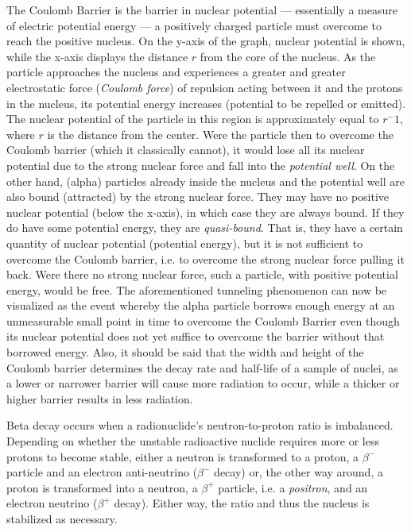 The Coulomb Barrier is the barrier in nuclear potential --- essentially a measure of electric potential energy --- a positively charged particle must overcome to reach the positive nucleus. On the y-axis of the graph, nuclear potential is shown, while the x-axis displays the distance $r$ from the core of the nucleus. As the particle approaches the nucleus and experiences a greater and greater electrostatic force (\emph{Coulomb force}) of repulsion acting between it and the protons in the nucleus, its potential energy increases (potential to be repelled or emitted). The nuclear potential of the particle in this region is approximately equal to $r^-1$, where $r$ is the distance from the center. Were the particle then to overcome the Coulomb barrier (which it classically cannot), it would lose all its nuclear potential due to the strong nuclear force and fall into the \emph{potential well}. On the other hand, (alpha) particles already inside the nucleus and the potential well are also bound (attracted) by the strong nuclear force. They may have no positive nuclear potential (below the x-axis), in which case they are always bound. If they do have some potential energy, they are \emph{quasi-bound}. That is, they have a certain quantity of nuclear potential (potential energy), but it is not sufficient to overcome the Coulomb barrier, i.e. to overcome the strong nuclear force pulling it back. Were there no strong nuclear force, such a particle, with positive potential energy, would be free. The aforementioned tunneling phenomenon can now be visualized as the event whereby the alpha particle borrows enough energy at an unmeasurable small point in time to overcome the Coulomb Barrier even though its nuclear potential does not yet suffice to overcome the barrier without that borrowed energy. Also, it should be said that the width and height of the Coulomb barrier determines the decay rate and half-life of a sample of nuclei, as a lower or narrower barrier will cause more radiation to occur, while a thicker or higher barrier results in less radiation.


Beta decay occurs when a radionuclide's neutron-to-proton ratio is imbalanced. Depending on whether the unstable radioactive nuclide requires more or less protons to become stable, either a neutron is transformed to a proton, a $\beta^-$ particle and an electron anti-neutrino ($\beta^-$ decay) or, the other way around, a proton is transformed into a neutron, a $\beta^+$ particle, i.e. a \emph{positron}, and an electron neutrino ($\beta^+$ decay). Either way, the ratio and thus the nucleus is stabilized as necessary.


